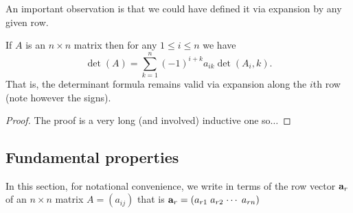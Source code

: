 \documentclass[10pt, a4paper]{article}
\begin{document}
An important observation is that we could have defined it via expansion by any given row.
\begin{lemma}\label{pre_linalg_lem_detanyrow}
    If $A$ is an $n \times n$ matrix then for any $1 \leq i \leq n$ we have
    \[
    \det(A) = \sum_{k = 1}^{n}(-1) ^ {i + k}a_{ik}\det(A_i, k).
    \]
    That is,
    the determinant formula remains valid via expansion along the $i$th row
    (note however the signs).
    \begin{proof}
        The proof is a very long (and involved) inductive one so$\dotsc$
    \end{proof}
\end{lemma}

\subsection{Fundamental properties}
In this section,
for notational convenience,
we write in terms of the row vector $\mathbf{a}_r$ of an $n \times n$ matrix $A = (a_{ij})$ that is $\mathbf{a}_r = (a_{r1}\; a_{r2}\; \dotsi \; a_{rn})$
\end{document}
